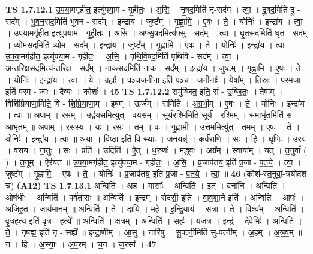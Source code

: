 \documentclass[17pt]{extarticle}
\begin{document}
                                \textbf{ TS 1.7.12.1} \newline
                  उ॒प॒या॒मगृ॑हीत॒ इत्यु॑पया॒म - गृ॒ही॒तः॒ । अ॒सि॒ । नृ॒षद॒मिति॑ नृ-सद᳚म् । त्वा॒ । द्रु॒षद॒मिति॑ द्रु - सद᳚म् । भु॒व॒न॒सद॒मिति॑ भुवन - सद᳚म् । इन्द्रा॑य । जुष्ट᳚म् । गृ॒ह्णा॒मि॒ । ए॒षः । ते॒ । योनिः॑ । इन्द्रा॑य । त्वा॒ । उ॒प॒या॒मगृ॑हीत॒ इत्यु॑पया॒म - गृ॒ही॒तः॒ । अ॒सि॒ । अ॒फ्सु॒षद॒मित्य॑फ्सु - सद᳚म् । त्वा॒ । घृ॒त॒सद॒मिति॑ घृत - सद᳚म् । व्यो॒म॒सद॒मिति॑ व्योम - सद᳚म् । इन्द्रा॑य । जुष्ट᳚म् । गृ॒ह्णा॒मि॒ । ए॒षः । ते॒ । योनिः॑ । इन्द्रा॑य । त्वा॒ । उ॒प॒या॒मगृ॑हीत॒ इत्यु॑पया॒म - गृ॒ही॒तः॒ । अ॒सि॒ । पृ॒थि॒वि॒षद॒मिति॑ पृथिवि - सद᳚म् । त्वा॒ । अ॒न्त॒रि॒क्ष॒सद॒मित्य॑न्तरिक्ष - सद᳚म् । ना॒क॒सद॒मिति॑ नाक - सद᳚म् । इन्द्रा॑य । जुष्ट᳚म् । गृ॒ह्णा॒मि॒ । ए॒षः । ते॒ । योनिः॑ । इन्द्रा॑य । त्वा॒ ॥ ये । ग्रहाः᳚ । प॒ञ्च॒ज॒नीना॒ इति॑ पञ्च - ज॒नीनाः᳚ । येषा᳚म् । ति॒स्रः । प॒र॒म॒जा इति॑ परम - जाः ॥ दैव्यः॑ । कोशः॑ । \textbf{  45} \newline
                  \newline
                                \textbf{ TS 1.7.12.2} \newline
                  समु॑ब्जित॒ इति॒ सं - उ॒ब्जि॒तः॒ ॥ तेषा᳚म् । विशि॑प्रियाणा॒मिति॒ वि - शि॒प्रि॒या॒णा॒म् । इष᳚म् । ऊर्ज᳚म् । समिति॑ । अ॒ग्र॒भी॒म् । ए॒षः । ते॒ । योनिः॑ । इन्द्रा॑य । त्वा॒ ॥ अ॒पाम् । रस᳚म् । उद्व॑यस॒मित्युत् - व॒य॒स॒म् । सूर्य॑रश्मि॒मिति॒ सूर्य॑ - र॒श्मि॒म् । स॒माभृ॑त॒मिति॑ सं - आभृ॑तम् ॥ अ॒पाम् । रस॑स्य । यः । रसः॑ । तम् । वः॒ । गृ॒ह्णा॒मी॒ । उ॒त्त॒ममित्यु॑त् - त॒मम् । ए॒षः । ते॒ । योनिः॑ । इन्द्रा॑य । त्वा॒ ॥ अ॒या । वि॒ष्ठा इति॑ वि-स्थाः । ज॒नयन्न्॑ । कर्व॑राणि । सः । हि । घृणिः॑ । उ॒रुः । वरा॑य । गा॒तुः ॥ सः । प्रति॑ । उदिति॑ । ऐ॒त् । ध॒रुणः॑ । मद्ध्वः॑ । अग्र᳚म् । स्वाया᳚म् । यत् । त॒नुवां᳚ ( ) । त॒नूम् । ऐर॑यत ॥ उ॒प॒या॒मगृ॑हीत॒ इत्यु॑पया॒म - गृ॒ही॒तः॒ । अ॒सि॒ । प्र॒जाप॑तय॒ इति॑ प्र॒जा - प॒त॒ये॒ । त्वा॒ । जुष्ट᳚म् । गृ॒ह्णा॒मि॒ । ए॒षः । ते॒ । योनिः॑ । प्र॒जाप॑तय॒ इति॑ प्र॒जा - प॒त॒ये॒ । त्वा॒ ॥ \textbf{  46 } \newline
                  \newline
                      (कोश॑-स्त॒नुवां॒-त्रयो॑दश च)  \textbf{(A12)} \newline \newline
                                \textbf{ TS 1.7.13.1} \newline
                  अन्विति॑ । अह॑ । मासाः᳚ । अन्विति॑ । इत् । वना॑नि । अन्विति॑ । ओष॑धीः । अन्विति॑ । पर्व॑तासः ॥ अन्विति॑ । इन्द्र᳚म् । रोद॑सी॒ इति॑ । वा॒व॒शा॒ने इति॑ । अन्विति॑ । आपः॑ । अ॒जि॒ह॒त॒ । जाय॑मानम् ॥ अन्विति॑ । ते॒ । दा॒यि॒ । म॒हे । इ॒न्द्रि॒याय॑ । स॒त्रा । ते॒ । विश्व᳚म् । अन्विति॑ । वृ॒त्र॒हत्य॒ इति॑ वृत्र - हत्ये᳚ ॥ अन्विति॑ । क्ष॒त्रम् । अन्विति॑ । सहः॑ । य॒ज॒त्र॒ । इन्द्र॑ । दे॒वेभिः॑ । अन्विति॑ । ते॒ । नृ॒षह्य॒ इति॑ नृ - सह्ये᳚ ॥ इ॒न्द्रा॒णीम् । आ॒सु । नारि॑षु । सु॒पत्नी॒मिति॑ सु-पत्नी᳚म् । अ॒हम् । अ॒श्र॒व॒म् ॥ न । हि । अ॒स्याः॒ । अ॒प॒रम् । च॒न । ज॒रसा᳚ । \textbf{  47} \newline
\end{document}
